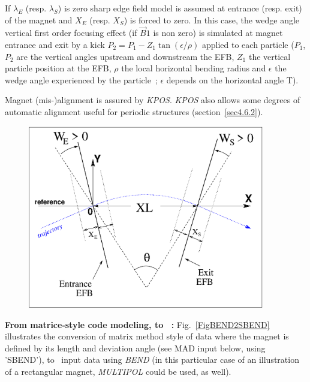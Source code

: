 {\noindent If $\lambda_{E} $ (resp. $\lambda_{S} $) is zero sharp edge field model is assumed at entrance 
(resp. exit) of the magnet and $X_E$ (resp. $X_S$) is forced to zero.  In this case, the wedge angle vertical first order 
focusing effect (if $\vec  B1$ is non zero) is simulated at magnet entrance and exit by a kick 
$P_2 = P_1 - Z_1 \tan (\epsilon / \rho)$ applied to each particle ($P_1$, $P_2$ are the vertical angles 
upstream and downstream the EFB, $Z_1$ the vertical particle position at the EFB, $\rho$ the local horizontal 
bending radius and $\epsilon$ the wedge angle experienced by the particle~; $\epsilon$ depends on the horizontal angle T).


\bigskip

\noindent Magnet (mis-)alignment is assured by \textsl{KPOS}. 
\textsl{KPOS} also  allows some degrees of automatic alignment useful for periodic structures (section~\ref{sec4.6.2}).

\vfill
\begin{figure}[H]
  \centerline{\includegraphics[height=8cm]{Fig14.eps}}
  {\setlength{\captionwidth}{12cm}
	\hangcaption[Fig14]{\label{fig14}
               \CapBEND
    } }
\end{figure}

\bigskip


\noindent \textbf{From matrice-style code modeling, to \zgou~:}  
Fig.~\ref{FigBEND2SBEND} illustrates the conversion of matrix method style of data 
where the magnet is defined by its length and deviation angle (see MAD input 
 below, using 'SBEND'), to \zgou\ input data using \textsl{BEND} 
(in this particular case of an illustration of a rectangular magnet, \textsl{MULTIPOL} could be used, as well). 


}
